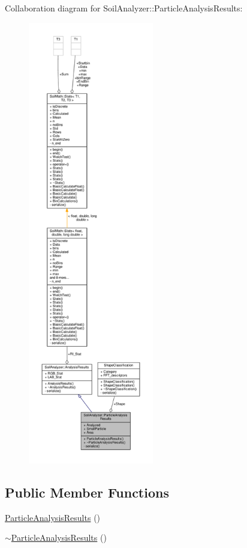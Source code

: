 Collaboration diagram for Soil\+Analyzer\+:\+:Particle\+Analysis\+Results\+:\nopagebreak
\begin{figure}[H]
\begin{center}
\leavevmode
\includegraphics[height=550pt]{class_soil_analyzer_1_1_particle_analysis_results__coll__graph}
\end{center}
\end{figure}
\subsection*{Public Member Functions}
\begin{DoxyCompactItemize}
\item 
\hyperlink{class_soil_analyzer_1_1_particle_analysis_results_a5107ea5aae70deadb77ab22c2429f7f6}{Particle\+Analysis\+Results} ()
\item 
\hyperlink{class_soil_analyzer_1_1_particle_analysis_results_aac752bb68987b0d4e78d506c68a1ebeb}{$\sim$\+Particle\+Analysis\+Results} ()
\end{DoxyCompactItemize}

